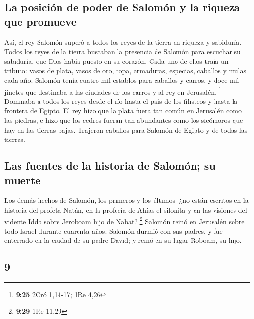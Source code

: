 \begin{paracol}{2}
\hypertarget{la-posiciuxf3n-de-poder-de-salomuxf3n-y-la-riqueza-que-promueve}{%
\subsection{La posición de poder de Salomón y la riqueza que
promueve}\label{la-posiciuxf3n-de-poder-de-salomuxf3n-y-la-riqueza-que-promueve}}

 Así, el rey Salomón superó a todos los reyes de la
tierra en riqueza y sabiduría.  Todos los reyes de la
tierra buscaban la presencia de Salomón para escuchar su sabiduría, que
Dios había puesto en su corazón.  Cada uno de ellos traía
un tributo: vasos de plata, vasos de oro, ropa, armaduras, especias,
caballos y mulas cada año.  Salomón tenía cuatro mil
establos para caballos y carros, y doce mil jinetes que destinaba a las
ciudades de los carros y al rey en Jerusalén. \footnote{\textbf{9:25}
  2Cró 1,14-17; 1Re 4,26}  Dominaba a todos los reyes
desde el río hasta el país de los filisteos y hasta la frontera de
Egipto.  El rey hizo que la plata fuera tan común en
Jerusalén como las piedras, e hizo que los cedros fueran tan abundantes
como los sicómoros que hay en las tierras bajas. 
Trajeron caballos para Salomón de Egipto y de todas las tierras.

\hypertarget{las-fuentes-de-la-historia-de-salomuxf3n-su-muerte}{%
\subsection{Las fuentes de la historia de Salomón; su
muerte}\label{las-fuentes-de-la-historia-de-salomuxf3n-su-muerte}}

 Los demás hechos de Salomón, los primeros y los últimos,
¿no están escritos en la historia del profeta Natán, en la profecía de
Ahías el silonita y en las visiones del vidente Iddo sobre Jeroboam hijo
de Nabat? \footnote{\textbf{9:29} 1Re 11,29}  Salomón
reinó en Jerusalén sobre todo Israel durante cuarenta años.
 Salomón durmió con sus padres, y fue enterrado en la
ciudad de su padre David; y reinó en su lugar Roboam, su hijo.

\switchcolumn
\begin{otherlanguage}{english}

\hypertarget{section-17}{%
\section{9}\label{section-17}}


\end{otherlanguage}
\end{paracol}
